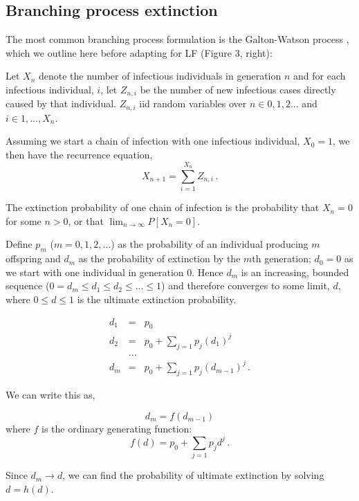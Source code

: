\subsection[Branching processes]{Branching process extinction}
The most common branching process formulation is the Galton-Watson process \cite{Watson1875}, which we outline here before adapting for LF (Figure 3, right):

Let $X_n$ denote the number of infectious individuals in generation $n$ and for each infectious individual, $i$, let $Z_{n,i}$ be the number of new infectious cases directly caused by that individual. $Z_{n,i}$ iid random variables over $n\in{0,1,2...}$ and $i\in{1,...,X_n}$.

Assuming we start a chain of infection with one infectious individual, $X_0=1$, we then have the recurrence equation,
\begin{equation}
    X_{n+1} = \sum_{i=1}^{X_n}Z_{n,i}\,.
\end{equation}

The extinction probability of one chain of infection is the probability that $X_n=0$ for some $n>0$, or that $\lim_{n\rightarrow\infty}P[X_n=0]$.

Define $p_m$ ($m=0,1,2,...$) as the probability of an individual producing $m$ offspring and $d_m$ as the probability of extinction by the $m$th generation; $d_0=0$ as we start with one individual in generation $0$. Hence $d_m$ is an increasing, bounded sequence ($0=d_m\leq d_1\leq d_2\leq ... \leq 1$) and therefore converges to some limit, $d$, where $0\leq d\leq 1$ is the ultimate extinction probability.

\begin{eqnarray}
    d_1 &=& p_0 \\
    d_2 &=& p_0 + \sum_{j=1}p_j(d_1)^j\\
    &...&\\
    d_m &=& p_0 +  \sum_{j=1}p_j(d_{m-1})^j \,.
\end{eqnarray}

We can write this as,

\begin{equation}
    d_m = f(d_{m-1})
\end{equation}
where $f$ is the ordinary generating function:
\begin{equation}
   f(d) = p_0 +  \sum_{j=1}p_jd^j \,.
\end{equation}

Since $d_m\rightarrow d$, we can find the probability of ultimate extinction by solving $d=h(d)$. 

